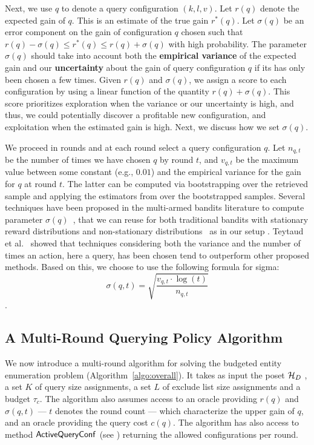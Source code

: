 Next, we use $q$ to denote a query configuration $(k,l,v)$. Let $r(q)$ denote the expected gain of $q$. This is an estimate of the true gain $r^*(q)$. Let $\sigma(q)$ be an error component on the gain of configuration $q$ chosen such that $r(q) - \sigma(q) \leq r^*(q) \leq r(q) + \sigma(q)$ with high probability. The parameter $\sigma(q)$ should take into account both the {\bf empirical variance} of the expected gain and our {\bf uncertainty} about the gain of query configuration $q$ if its has only been chosen a few times. Given $r(q)$ and $\sigma(q)$, we assign a score to each configuration by using a linear function of the quantity $r(q) + \sigma(q)$. This score prioritizes exploration when the variance or our uncertainty is high, and thus, we could potentially discover a profitable new configuration, and exploitation when the estimated gain is high. Next, we discuss how we set $\sigma(q)$.

We proceed in rounds and at each round select a query configuration $q$. Let $n_{q,t}$ be the number of times we have chosen $q$ by round $t$, and $v_{q,t}$ be the maximum value between some constant (e.g., $0.01$) and the empirical variance for the gain for $q$ at round $t$. The latter can be computed via bootstrapping over the retrieved sample and applying the estimators from  over the bootstrapped samples. Several techniques have been proposed in the multi-armed bandits literature to compute parameter $\sigma(q)$~\cite{teytaud:inria-00173263},
that we can reuse\iftr
for both traditional bandits with stationary reward distributions and non-stationary distributions~\cite{besbes2014stochastic} as in our setup
. Teytaud et al.~\cite{teytaud:inria-00173263} showed that techniques considering both the variance and the number of times an action, here a query, has been chosen tend to outperform other proposed methods. Based on this, we choose to use the following formula for sigma:
\begin{equation}
\label{eq:upper}
\sigma(q,t) = \sqrt{\frac{v_{q,t}\cdot\log(t)}{n_{q,t}}}
\end{equation}\fi.

\subsection{A Multi-Round Querying Policy Algorithm}
\label{sec:heuristic}

We now introduce a multi-round algorithm for solving the budgeted entity enumeration problem (Algorithm~\ref{algo:overall}). It takes as input the poset $\mathcal{H}_D$ , a set $K$ of query size assignments, a set $L$ of exclude list size assignments and a budget $\tau_c$. The algorithm also assumes access to an oracle providing $r(q)$ and $\sigma(q,t)$ --- $t$ denotes the round count ---  which characterize the upper gain of $q$, and an oracle providing the query cost $c(q)$. The algorithm has also access to method ${\sf ActiveQueryConf}$ (see ) returning the allowed configurations per round.

